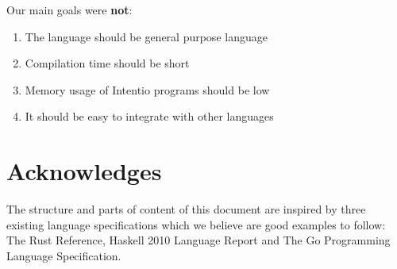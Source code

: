Our main goals were \textbf{not}:
\begin{enumerate}
  \item The language should be general purpose language
  \item Compilation time should be short
  \item Memory usage of Intentio programs should be low
  \item It should be easy to integrate with other languages
\end{enumerate}

\section*{Acknowledges}

The structure and parts of content of this document are inspired by three existing language specifications which we believe are good examples to follow: The Rust Reference\cite{TheRustReference}, Haskell 2010 Language Report\cite{Marlow_haskell2010} and The Go Programming Language Specification\cite{TheGoProgrammingLanguage}.
